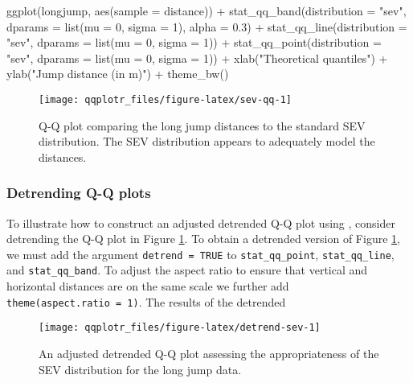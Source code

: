 \begin{Schunk}
\begin{Sinput}
ggplot(longjump, aes(sample = distance)) +
  stat_qq_band(distribution = "sev", dparams = list(mu = 0, sigma = 1), alpha = 0.3) +
  stat_qq_line(distribution = "sev", dparams = list(mu = 0, sigma = 1)) +
  stat_qq_point(distribution = "sev", dparams = list(mu = 0, sigma = 1)) +
  xlab("Theoretical quantiles") +
  ylab("Jump distance (in m)") +
  theme_bw()
\end{Sinput}
\begin{figure}

{\centering \texttt{[image: qqplotr\_files/figure-latex/sev-qq-1]} 

}

\caption[Q-Q plot comparing the long jump distances to the standard SEV distribution]{Q-Q plot comparing the long jump distances to the standard SEV distribution. The SEV distribution appears to adequately model the distances.}\label{fig:sev-qq}
\end{figure}
\end{Schunk}

\subsubsection{Detrending Q-Q plots}\label{detrending-q-q-plots}

\label{sec:detrending}

To illustrate how to construct an adjusted detrended Q-Q plot using
, consider detrending the Q-Q plot in Figure
\ref{fig:sev-qq}. To obtain a detrended version of Figure
\ref{fig:sev-qq}, we must add the argument \texttt{detrend\ =\ TRUE} to
\texttt{stat\_qq\_point}, \texttt{stat\_qq\_line}, and
\texttt{stat\_qq\_band}. To adjust the aspect ratio to ensure that
vertical and horizontal distances are on the same scale we further add
\texttt{theme(aspect.ratio\ =\ 1)}. The results of the detrended

\begin{Schunk}
\begin{figure}

{\centering \texttt{[image: qqplotr\_files/figure-latex/detrend-sev-1]} 

}

\caption[An adjusted detrended Q-Q plot assessing the appropriateness of the SEV distribution for the long jump data]{An adjusted detrended Q-Q plot assessing the appropriateness of the SEV distribution for the long jump data.}\label{fig:detrend-sev}
\end{figure}
\end{Schunk}

